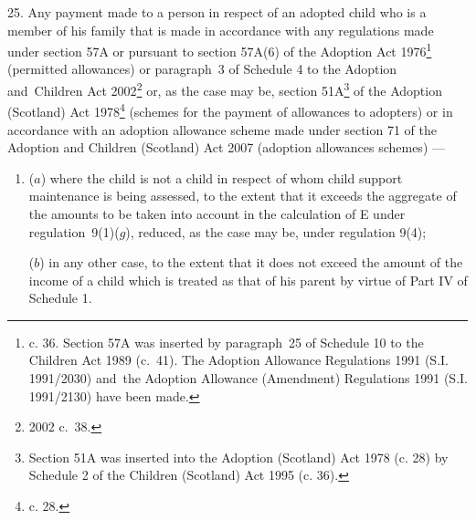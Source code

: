 \documentclass[12pt,a4paper]{article}
\begin{document}
\medskip

25.  Any payment made to a person in respect of an adopted child who is a member of his family that is made in accordance with any regulations made under section 57A or pursuant to section 57A(6) of the Adoption Act 1976\footnote{ c. 36. Section 57A was inserted by paragraph~25 of Schedule 10 to the Children Act 1989 (c.~41). The Adoption Allowance Regulations 1991 (S.I. 1991/2030) and~the Adoption Allowance (Amendment) Regulations 1991 (S.I. 1991/2130) have been made.} (permitted allowances) 
or paragraph~3 of Schedule 4 to the Adoption and~Children Act 2002\footnote{2002 c.\ 38.}  %
or, as the case may be, 
section 51A\footnote{\frenchspacing Section 51A was inserted into the Adoption (Scotland) Act 1978 (c. 28) by Schedule 2 of the Children (Scotland) Act 1995 (c. 36).}  %
of the Adoption (Scotland) Act 1978\footnote{ c. 28.} (schemes for the payment of allowances to adopters)
or in accordance with an adoption allowance scheme made under section 71 of the Adoption and Children (Scotland) Act 2007 (adoption allowances schemes)%
—
\begin{enumerate}\item[]
($a$) where the child is not a child in respect of whom child support maintenance is being assessed, to the extent that it exceeds 
the aggregate of the amounts to be taken into account in the calculation of E under regulation~9(1)($g$), %
reduced, as the case may be, under regulation 9(4);

($b$) in any other case, to the extent that it does not exceed the amount of the income of a child which is treated as that of his parent by virtue of Part IV
of Schedule 1.  %
\end{enumerate}

\end{document}
